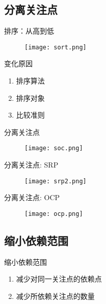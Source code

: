 \subsection{分离关注点}

\begin{frame}[fragile]{排序：从高到低}
  \begin{figure}
    \centering
    \texttt{[image: sort.png]}
  \end{figure}
\end{frame}

\begin{frame}[fragile]{变化原因}
  \begin{enumerate}
    \item \alert{排序算法}
    \item \alert{排序对象}
    \item \alert{比较准则}            
  \end{enumerate}
\end{frame}

\begin{frame}[fragile]{分离关注点}
  \begin{figure}
    \centering
    \texttt{[image: soc.png]}
  \end{figure}
\end{frame}

\begin{frame}[fragile]{分离关注点: SRP}
  \begin{figure}
    \centering
    \texttt{[image: srp2.png]}
  \end{figure}
\end{frame}

\begin{frame}[fragile]{分离关注点: OCP}
  \begin{figure}
    \centering
    \texttt{[image: ocp.png]}
  \end{figure}
\end{frame}

\subsection{缩小依赖范围}

\begin{frame}[fragile]{缩小依赖范围}
  \begin{enumerate}
    \item \alert{减少对同一关注点的依赖点}
    \item \alert{减少所依赖关注点的数量}
  \end{enumerate}
\end{frame}

